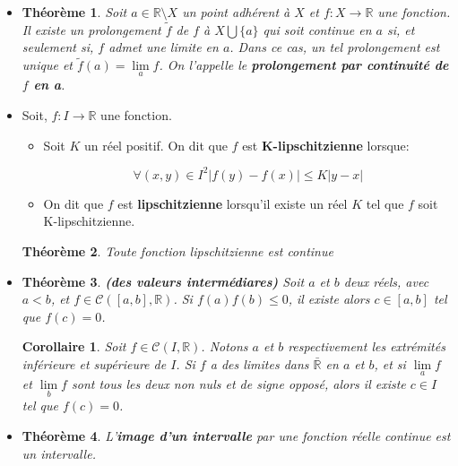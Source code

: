 \documentclass[10pt,a4paper,oneside]{article}
\newtheorem{theoreme}{Théorème}
\newtheorem{corollaire}{Corollaire}
\begin{document}
\begin{itemize}
\begin{itemize}
\end{itemize}

\item
\begin{theoreme}
Soit $a \in \mathbb{R} \setminus X$ un point adhérent à $X$ et $f:X \to \mathbb{R}$ une fonction.
Il existe un prolongement $\tilde{f}$ de $f$ à $X \bigcup \{ a \}$ qui soit continue en $a$ si, et seulement si, $f$ admet une limite en $a$. Dans ce cas, un tel prolongement est unique et $\tilde{f}(a) = \underset{a}{\lim} f$.
On l'appelle le \textbf{prolongement par continuité de $f$ en a}.
\end{theoreme}

\item
Soit, $f: I \to \mathbb{R}$ une fonction.

\begin{itemize}
\item
Soit $K$ un réel positif. On dit que $f$ est \textbf{K-lipschitzienne} lorsque:

\[ \forall(x,y) \in I^2 |f(y) - f(x)| \leq K|y - x| \]

\item
On dit que $f$ est \textbf{lipschitzienne} lorsqu'il existe un réel $K$ tel que $f$ soit K-lipschitzienne.
\end{itemize}

\begin{theoreme}
Toute fonction lipschitzienne est continue
\end{theoreme}

\item
\begin{theoreme} \textbf{(des valeurs intermédiares)}
Soit $a$ et $b$ deux réels, avec $a < b$, et $f \in \mathcal{C}([a,b],\mathbb{R})$.
Si $f(a)f(b) \leq 0$, il existe alors $c \in [a,b]$ tel que $f(c) = 0$.
\end{theoreme}

\begin{corollaire}
Soit $f \in \mathcal{C}(I,\mathbb{R})$. Notons $a$ et $b$ respectivement les extrémités inférieure et supérieure de $I$.
Si $f$ a des limites dans $\bar{\mathbb{R}}$ en $a$ et $b$, et si $\underset{a}{\lim} f$ et $\underset{b}{\lim} f$ sont tous les deux non nuls et de signe opposé, alors il existe $c \in I$ tel que $f(c) = 0$.
\end{corollaire}

\item
\begin{theoreme}
L'\textbf{image d'un intervalle} par une fonction réelle continue est un intervalle.
\end{theoreme}


\end{itemize}
\end{document}
